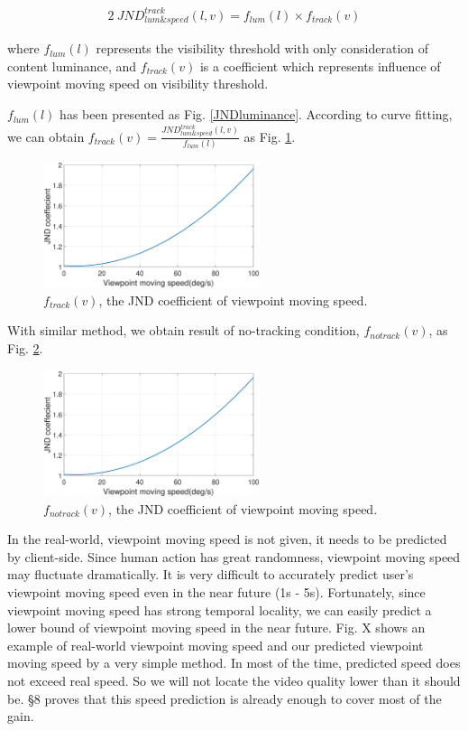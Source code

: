 \begin{alignat}{2}\
JND_{lum\&speed}^{track}(l, v) = f_{lum}(l) \times f_{track}(v)
\end{alignat}

where $f_{lum}(l)$ represents the visibility threshold with only consideration of content luminance, and $f_{track}(v)$ is a coefficient which represents influence of viewpoint moving speed on visibility threshold.

$f_{lum}(l)$ has been presented as Fig. \ref{JNDluminance}. According to curve fitting, we can obtain $f_{track}(v) = \frac{JND_{lum\&speed}^{track}(l, v)}{f_{lum}(l)}$ as Fig. \ref{JNDspeed-track}.

\begin{figure}
  \centering
  \includegraphics[width=2.5in]{images/JNDspeed.eps}
  \caption{$f_{track}(v)$, the JND coefficient of viewpoint moving speed.}
  \label{JNDspeed-track}
  \end{figure}

With similar method, we obtain result of no-tracking condition, $f_{notrack}(v)$, as Fig. \ref{JNDspeed-notrack}.

\begin{figure}
  \centering
  \includegraphics[width=2.5in]{images/JNDspeed.eps}
  \caption{$f_{notrack}(v)$, the JND coefficient of viewpoint moving speed.}
  \label{JNDspeed-notrack}
  \end{figure}

In the real-world, viewpoint moving speed is not given, it needs to be predicted by client-side. Since human action has great randomness, viewpoint moving speed may fluctuate dramatically. It is very difficult to accurately predict user's viewpoint moving speed even in the near future (1s - 5s). Fortunately, since viewpoint moving speed has strong temporal locality, we can easily predict a lower bound of viewpoint moving speed in the near future. Fig. X shows an example of real-world viewpoint moving speed and our predicted viewpoint moving speed by a very simple method. In most of the time, predicted speed does not exceed real speed. So we will not locate the video quality lower than it should be. \S 8 proves that this speed prediction is already enough to cover most of the gain.

